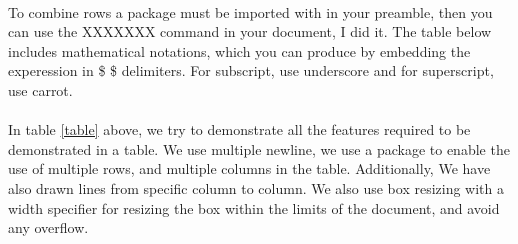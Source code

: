 \documentclass[titlepage,11pt,a4paper]{article}
\begin{document}
\newpage

\begin{table}[H] 
\caption{Table depicting the use of both multirow and multicolumn}
\label{table}
\end{table}

\paragraph{} To combine rows a package must be imported with in your preamble, then you can use the XXXXXXX command in your document, I did it. The table below includes mathematical notations, which you can produce by embedding the experession in \$ \$ delimiters. For subscript, use underscore and for superscript, use carrot. 
\paragraph{} {\Large In table \ref{table} above, we try to demonstrate all the features required to be demonstrated in a table. We use multiple newline, we use a package to enable the use of multiple rows, and multiple columns in the table. Additionally, We have also drawn
lines from specific column to column. We also use box resizing with a width specifier for resizing the box within the limits of the document,  and avoid any overflow.}
\end{document}
